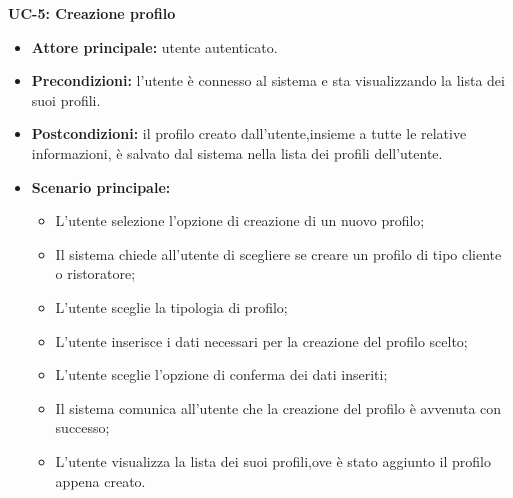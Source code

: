 \textbf{UC-5: Creazione profilo}
\begin{itemize}
    \item \textbf{Attore principale:} utente autenticato.
    \item \textbf{Precondizioni:} l'utente è connesso al sistema e sta visualizzando la lista dei suoi profili.
    \item \textbf{Postcondizioni:} il profilo creato dall'utente,insieme a tutte le relative informazioni,
    è salvato dal sistema nella lista dei profili dell'utente.
    \item \textbf{Scenario principale:}
    \begin{itemize}
        \item L'utente selezione l'opzione di creazione di un nuovo profilo;
        \item Il sistema chiede all'utente di scegliere se creare un profilo di tipo cliente
        o ristoratore;
        \item L'utente sceglie la tipologia di profilo;
        \item L'utente inserisce i dati necessari per la creazione del profilo scelto;
        \item L'utente sceglie l'opzione di conferma dei dati inseriti;
        \item Il sistema comunica all'utente che la creazione del profilo è avvenuta con successo;
        \item L'utente visualizza la lista dei suoi profili,ove è stato aggiunto il profilo appena creato.
    \end{itemize}
\end{itemize}

